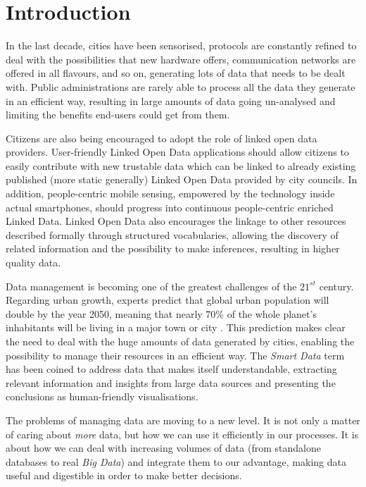 \section{Introduction}
\label{sec:introduction}

In the last decade, cities have been sensorised, protocols are constantly refined to deal with the possibilities that new hardware offers, communication networks are offered in all flavours, and so on, generating lots of data that needs to be dealt with. Public administrations are rarely able to process all the data they generate in an efficient way, resulting in large amounts of data going un-analysed and limiting the benefits end-users could get from them.

Citizens are also being encouraged to adopt the role of linked open data providers. User-friendly Linked Open Data applications should allow citizens to easily contribute with new trustable data which can be linked to already existing published (more static generally) Linked Open Data provided by city councils. In addition, people-centric mobile sensing, empowered by the technology inside actual smartphones, should progress into continuous people-centric enriched Linked Data. Linked Open Data also encourages the linkage to other resources described formally through structured vocabularies, allowing the discovery of related information and the possibility to make inferences, resulting in higher quality data.

Data management is becoming one of the greatest challenges of the $21^{st}$ century. Regarding urban growth, experts predict that global urban population will double by the year 2050, meaning that nearly 70\% of the whole planet's inhabitants will be living in a major town or city \cite{city2010urbanization}. This prediction makes clear the need to deal with the huge amounts of data generated by cities, enabling the possibility to manage their resources in an efficient way. The \textit{Smart Data} term has been coined to address data that makes itself understandable, extracting relevant information and insights from large data sources and presenting the conclusions as human-friendly visualisations.

The problems of managing data are moving to a new level. It is not only a matter of caring about \textit{more} data, but how we can use it efficiently in our processes. It is about how we can deal with increasing volumes of data (from standalone databases to real \textit{Big Data}) and integrate them to our advantage, making data useful and digestible in order to make better decisions.

